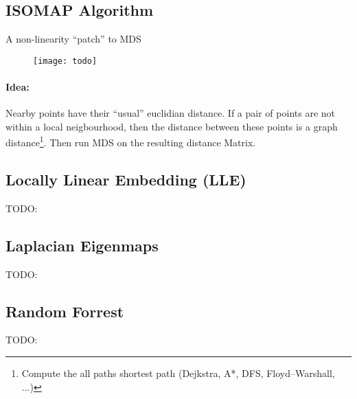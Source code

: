 \subsection{ISOMAP Algorithm}
A non-linearity ``patch'' to MDS

\begin{figure}[H]
	\centering
	\texttt{[image: todo]}
\end{figure}

\paragraph{Idea:} Nearby points have their ``usual'' euclidian distance. If a pair of points are not within a local neigbourhood, then the distance between these points is a graph distance\footnote{Compute the all paths shortest path (Dejkstra, A*,  DFS, Floyd–Warshall, ...)}. Then run MDS on the resulting distance Matrix.

\subsection{Locally Linear Embedding (LLE)}
TODO:

\subsection{Laplacian Eigenmaps}
TODO:

\subsection{Random Forrest}
TODO:
